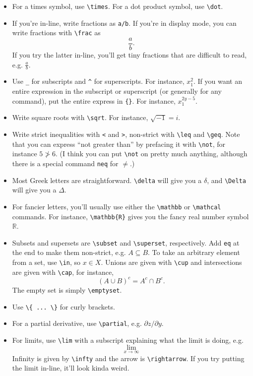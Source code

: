 \documentclass[12pt]{article}
\begin{document}
	\begin{itemize}
		\item For a times symbol, use \verb|\times|. For a dot product symbol, use \verb|\dot|. 
		\item If you're in-line, write fractions as \verb|a/b|. If you're in display mode, you can write fractions with \verb|\frac| as \[ \frac{a}{b}. \]
		If you try the latter in-line, you'll get tiny fractions that are difficult to read, e.g. $\frac{a}{b}$. 
		\item Use \verb|_| for subscripts and \verb|^| for superscripts. For instance, $x_1^2$. If you want an entire expression in the subscript or superscript (or generally for any command), put the entire express in \verb|{}|. For instance, $x_1^{2y-5}$. 
		\item Write square roots with \verb|\sqrt|. For instance, $\sqrt{-1}=i$. 
		\item Write strict inequalities with \verb|<| and \verb|>|, non-strict with \verb|\leq| and \verb|\geq|. Note that you can express ``not greater than'' by prefacing it with  \verb|\not|, for instance $5 \not > 6$. (I think you can put \verb|\not| on pretty much anything, although there is a special command \verb|neq| for $\neq$.)
		\item Most Greek letters are straightforward. \verb|\delta| will give you a $\delta$, and \verb|\Delta| will give you a $\Delta$. 
		\item For fancier letters, you'll usually use either the \verb|\mathbb| or \verb|\mathcal| commands. For instance, \verb|\mathbb{R}| gives you the fancy real number symbol $\mathbb{R}$.
		\item Subsets and supersets are \verb|\subset| and \verb|\superset|, respectively. Add \verb|eq| at the end to make them non-strict, e.g. $A \subseteq B$. To take an arbitrary element from a set, use \verb|\in|, so $x \in X$. Unions are given with \verb|\cup| and intersections are given with \verb|\cap|, for instance,  
			\[	(A \cup B)^c=A^c \cap B^c . \]
		The empty set is simply \verb|\emptyset|. 
		\item Use \verb|\{ ... \}| for curly brackets. 
		\item For a partial derivative, use \verb|\partial|, e.g. $\partial z/\partial y$. 
		\item For limits, use \verb|\lim| with a subscript explaining what the limit is doing, e.g.
			\[ \lim_{x \rightarrow \infty}  \]
			Infinity is given by \verb|\infty| and  the arrow is \verb|\rightarrow|. If you try putting the limit in-line, it'll look kinda weird. 

\end{itemize}
\end{document}
